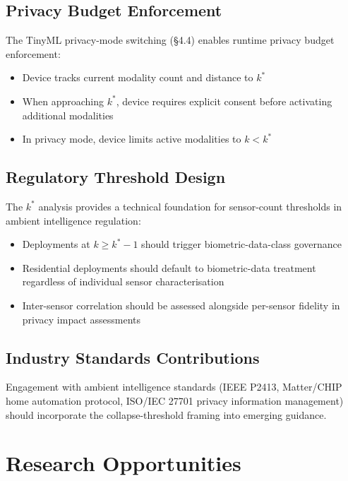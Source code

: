 \documentclass[sigconf,nonacm]{acmart}
\begin{document}
\subsection{Privacy Budget Enforcement}

The TinyML privacy-mode switching (§4.4) enables runtime privacy
budget enforcement:

\begin{itemize}
  \item Device tracks current modality count and distance to $k^*$
  \item When approaching $k^*$, device requires explicit
        consent before activating additional modalities
  \item In privacy mode, device limits active modalities to
        $k < k^*$
\end{itemize}

\subsection{Regulatory Threshold Design}

The $k^*$ analysis provides a technical foundation for
sensor-count thresholds in ambient intelligence regulation:

\begin{itemize}
  \item Deployments at $k \geq k^* - 1$ should trigger
        biometric-data-class governance
  \item Residential deployments should default to biometric-data
        treatment regardless of individual sensor characterisation
  \item Inter-sensor correlation should be assessed alongside
        per-sensor fidelity in privacy impact assessments
\end{itemize}

\subsection{Industry Standards Contributions}

Engagement with ambient intelligence standards (IEEE P2413,
Matter/CHIP home automation protocol, ISO/IEC 27701 privacy
information management) should incorporate the collapse-threshold
framing into emerging guidance.

\section{Research Opportunities}
\end{document}
